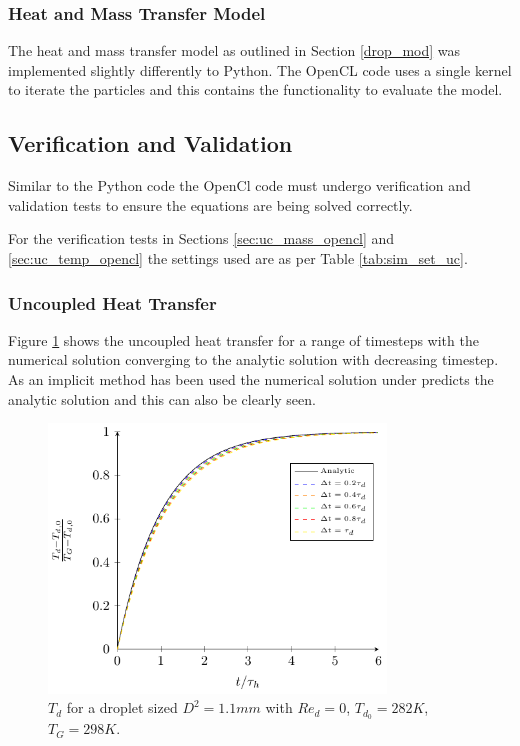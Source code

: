 \documentclass[../Interim_Report_Master]{subfiles}
\begin{document}
\subsubsection{Heat and Mass Transfer Model}
The heat and mass transfer model as outlined in Section \ref{drop_mod} was implemented slightly differently to Python. The OpenCL code uses a single kernel to iterate the particles and this contains the functionality to evaluate the model.

\subsection{Verification and Validation}
Similar to the Python code the OpenCl code must undergo verification and validation tests to ensure the equations are being solved correctly.

For the verification tests in Sections \ref{sec:uc_mass_opencl} and \ref{sec:uc_temp_opencl} the settings used are as per Table \ref{tab:sim_set_uc}.

\subsubsection{Uncoupled Heat Transfer}
Figure \ref{plot:uc_heat_v_opencl} shows the uncoupled heat transfer for a range of timesteps with the numerical solution converging to the analytic solution with decreasing timestep. As an implicit method has been used the numerical solution under predicts the analytic solution and this can also be clearly seen.

\begin{figure}[H]
	\centering
	\includegraphics[width=0.8\textwidth]{./Diagrams/Uncoupled_Heat_Transfer_Verification/Uncoupled_Heat_Transfer.pdf}
	\caption{$T_d$ for a droplet sized $D^2=1.1mm$ with $Re_d=0$, $T_{d_0}=282K$, $T_G=298K$.}
	\label{plot:uc_heat_v_opencl}
\end{figure}
\end{document}
